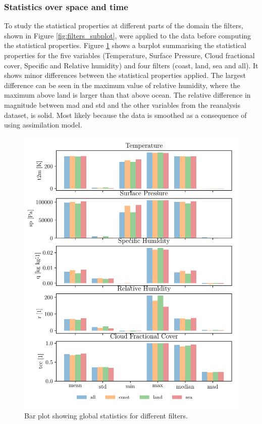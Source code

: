 \subsubsection{Statistics over space and time}
To study the statistical properties at different parts of the domain the filters, shown in Figure \ref{fig:filters_subplot}, were applied to the data before computing the statistical properties. Figure \ref{fig:bar_plot_global_stats} shows a barplot summarising the statistical properties for the five variables (Temperature, Surface Pressure, Cloud fractional cover, Specific and Relative humidity) and four filters (coast, land, sea and all). It shows minor differences between the statistical properties applied. The largest difference can be seen in the maximum value of relative humidity, where the maximum above land is larger than that above ocean. The relative difference in magnitude between \acrshort{mad} and \acrshort{std} and the other variables from the reanalysis dataset, is solid. Most likely because the data is smoothed as a consequence of using assimilation model. 
\begin{figure}[ht]
    \centering
    \includegraphics{python_figs/bar_plot_global_statistics_new_legend.pdf}
    \caption{Bar plot showing global statistics for different filters.}
    \label{fig:bar_plot_global_stats}
\end{figure}

